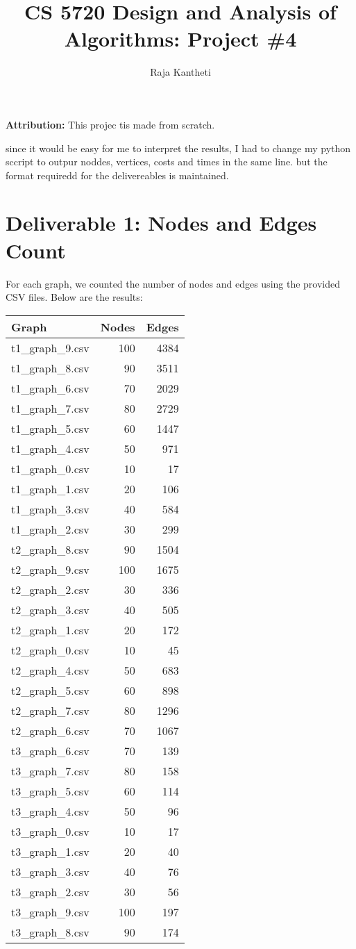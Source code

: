 \documentclass{article}
\title{CS 5720 Design and Analysis of Algorithms: Project \#4}
\author{Raja Kantheti}
\date{}
\begin{document}
\maketitle

\textbf{Attribution: }This projec tis made from scratch.

since it would be easy for me to interpret the results, I had to change my python sccript to outpur noddes, vertices, costs and times in the same line. but the format requiredd for the delivereables is maintained. 
\section*{Deliverable 1: Nodes and Edges Count}

For each graph, we counted the number of nodes and edges using the provided CSV files. Below are the results:

\begin{tabular}{|l|r|r|}
\hline
\textbf{Graph} & \textbf{Nodes} & \textbf{Edges} \\
\hline
t1\_graph\_9.csv & 100 & 4384 \\
t1\_graph\_8.csv & 90 & 3511 \\
t1\_graph\_6.csv & 70 & 2029 \\
t1\_graph\_7.csv & 80 & 2729 \\
t1\_graph\_5.csv & 60 & 1447 \\
t1\_graph\_4.csv & 50 & 971 \\
t1\_graph\_0.csv & 10 & 17 \\
t1\_graph\_1.csv & 20 & 106 \\
t1\_graph\_3.csv & 40 & 584 \\
t1\_graph\_2.csv & 30 & 299 \\
t2\_graph\_8.csv & 90 & 1504 \\
t2\_graph\_9.csv & 100 & 1675 \\
t2\_graph\_2.csv & 30 & 336 \\
t2\_graph\_3.csv & 40 & 505 \\
t2\_graph\_1.csv & 20 & 172 \\
t2\_graph\_0.csv & 10 & 45 \\
t2\_graph\_4.csv & 50 & 683 \\
t2\_graph\_5.csv & 60 & 898 \\
t2\_graph\_7.csv & 80 & 1296 \\
t2\_graph\_6.csv & 70 & 1067 \\
t3\_graph\_6.csv & 70 & 139 \\
t3\_graph\_7.csv & 80 & 158 \\
t3\_graph\_5.csv & 60 & 114 \\
t3\_graph\_4.csv & 50 & 96 \\
t3\_graph\_0.csv & 10 & 17 \\
t3\_graph\_1.csv & 20 & 40 \\
t3\_graph\_3.csv & 40 & 76 \\
t3\_graph\_2.csv & 30 & 56 \\
t3\_graph\_9.csv & 100 & 197 \\
t3\_graph\_8.csv & 90 & 174 \\
\hline
\end{tabular}
\end{document}
